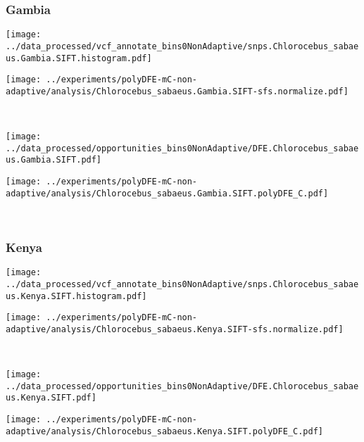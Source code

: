 \subsubsection{Gambia}

\begin{minipage}{0.49\linewidth}
    \texttt{[image: ../data\_processed/vcf\_annotate\_bins0NonAdaptive/snps.Chlorocebus\_sabaeus.Gambia.SIFT.histogram.pdf]}
\end{minipage}
\begin{minipage}{0.49\linewidth}
    \texttt{[image: ../experiments/polyDFE-mC-non-adaptive/analysis/Chlorocebus\_sabaeus.Gambia.SIFT-sfs.normalize.pdf]}
\end{minipage}
\\
\begin{minipage}{0.49\linewidth}
    \texttt{[image: ../data\_processed/opportunities\_bins0NonAdaptive/DFE.Chlorocebus\_sabaeus.Gambia.SIFT.pdf]}
\end{minipage}
\begin{minipage}{0.49\linewidth}
    \texttt{[image: ../experiments/polyDFE-mC-non-adaptive/analysis/Chlorocebus\_sabaeus.Gambia.SIFT.polyDFE\_C.pdf]}
\end{minipage}
\\

\subsubsection{Kenya}

\begin{minipage}{0.49\linewidth}
    \texttt{[image: ../data\_processed/vcf\_annotate\_bins0NonAdaptive/snps.Chlorocebus\_sabaeus.Kenya.SIFT.histogram.pdf]}
\end{minipage}
\begin{minipage}{0.49\linewidth}
    \texttt{[image: ../experiments/polyDFE-mC-non-adaptive/analysis/Chlorocebus\_sabaeus.Kenya.SIFT-sfs.normalize.pdf]}
\end{minipage}
\\
\begin{minipage}{0.49\linewidth}
    \texttt{[image: ../data\_processed/opportunities\_bins0NonAdaptive/DFE.Chlorocebus\_sabaeus.Kenya.SIFT.pdf]}
\end{minipage}
\begin{minipage}{0.49\linewidth}
    \texttt{[image: ../experiments/polyDFE-mC-non-adaptive/analysis/Chlorocebus\_sabaeus.Kenya.SIFT.polyDFE\_C.pdf]}
\end{minipage}
\\

